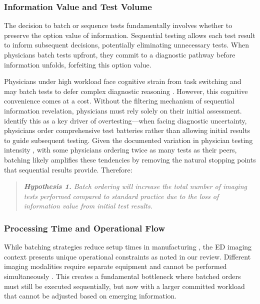 \documentclass[,,nonblindrev]{informs}
\begin{document}
\subsubsection{Information Value and Test
Volume}\label{information-value-and-test-volume}

The decision to batch or sequence tests fundamentally involves whether
to preserve the option value of information. Sequential testing allows
each test result to inform subsequent decisions, potentially eliminating
unnecessary tests. When physicians batch tests upfront, they commit to a
diagnostic pathway before information unfolds, forfeiting this option
value.

Physicians under high workload face cognitive strain from task switching
and may batch tests to defer complex diagnostic reasoning
\citep[\citet{skaugset2016can}]{kc2013does}. However, this cognitive
convenience comes at a cost. Without the filtering mechanism of
sequential information revelation, physicians must rely solely on their
initial assessment. \citep{lam2020why} identify this as a key driver of
overtesting---when facing diagnostic uncertainty, physicians order
comprehensive test batteries rather than allowing initial results to
guide subsequent testing. Given the documented variation in physician
testing intensity \citep{hodgson2018are}, with some physicians ordering
twice as many tests as their peers, batching likely amplifies these
tendencies by removing the natural stopping points that sequential
results provide. Therefore:

\begin{quote}
\small
\textit{\textbf{Hypothesis 1.} Batch ordering will increase the total number of imaging tests performed compared to standard practice due to the loss of information value from initial test results.}
\end{quote}

\subsubsection{Processing Time and Operational
Flow}\label{processing-time-and-operational-flow}

While batching strategies reduce setup times in manufacturing
\citep{Fowler2022}, the ED imaging context presents unique operational
constraints as noted in our review. Different imaging modalities require
separate equipment and cannot be performed simultaneously
\citep{Jessome2020}. This creates a fundamental bottleneck where batched
orders must still be executed sequentially, but now with a larger
committed workload that cannot be adjusted based on emerging
information.
\end{document}
